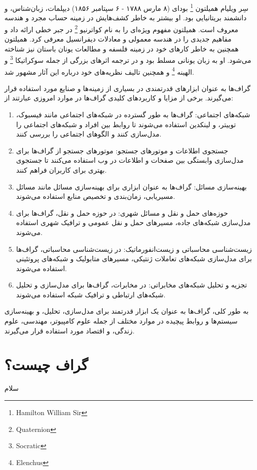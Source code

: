 \documentclass[a4paper,10pt]{book}
\begin{document}
        سِر ویلیام همیلتون
        \footnote{\hspace{2pt}Hamilton William Sir}
        بودای (۸ مارس ۱۷۸۸ - ۶ سپتامبر ۱۸۵۶) دیپلمات، زبان‌شناس، و دانشمند بریتانیایی بود. او بیشتر به خاطر کشف‌هایش در زمینه حساب مجرد و هندسه معروف است. همیلتون مفهوم ویژه‌ای را به نام کواترنیو
        \footnote{\hspace{2pt}Quaternion}
        در جبر خطی ارائه داد و مفاهیم جدیدی را در هندسه معمولی و معادلات دیفرانسیل معرفی کرد. همیلتون همچنین به خاطر کارهای خود در زمینه فلسفه و مطالعات یونان باستان نیز شناخته می‌شود. او به زبان یونانی مسلط بود و در ترجمه اثرهای بزرگی از جمله سوکراتیکا
        \footnote{\hspace{2pt}Socratic}
        و الهینه
        \footnote{\hspace{2pt}Elenchus}
        و همچنین تالیف نظریه‌های خود درباره این آثار مشهور شد.

        گراف‌ها به عنوان ابزارهای قدرتمندی در بسیاری از زمینه‌ها و صنایع مورد استفاده قرار می‌گیرند. برخی از مزایا و کاربردهای کلیدی گراف‌ها در موارد امروزی عبارتند از:

        \begin{enumerate}
            
            \item شبکه‌های اجتماعی: گراف‌ها به طور گسترده در شبکه‌های اجتماعی مانند فیسبوک، توییتر، و لینکدین استفاده می‌شوند تا روابط بین افراد و شبکه‌های اجتماعی را مدل‌سازی کنند و الگوهای اجتماعی را بررسی کنند.

            \item جستجوی اطلاعات و موتورهای جستجو: موتورهای جستجو از گراف‌ها برای مدل‌سازی وابستگی بین صفحات و اطلاعات در وب استفاده می‌کنند تا جستجوی بهتری برای کاربران فراهم کنند.

            \item بهینه‌سازی مسائل: گراف‌ها به عنوان ابزاری برای بهینه‌سازی مسائل مانند مسائل مسیریابی، زمان‌بندی و تخصیص منابع استفاده می‌شوند.

            \item حوزه‌های حمل و نقل و مسائل شهری: در حوزه حمل و نقل، گراف‌ها برای مدل‌سازی شبکه‌های جاده، مسیرهای حمل و نقل عمومی و ترافیک شهری استفاده می‌شوند.

            \item زیست‌شناسی محاسباتی و زیست‌انفورماتیک: در زیست‌شناسی محاسباتی، گراف‌ها برای مدل‌سازی شبکه‌های تعاملات ژنتیکی، مسیرهای متابولیک و شبکه‌های پروتئینی استفاده می‌شوند.

            \item تجزیه و تحلیل شبکه‌های مخابراتی: در مخابرات، گراف‌ها برای مدل‌سازی و تحلیل شبکه‌های ارتباطی و ترافیک شبکه استفاده می‌شوند.

        \end{enumerate}

        به طور کلی، گراف‌ها به عنوان یک ابزار قدرتمند برای مدل‌سازی، تحلیل، و بهینه‌سازی سیستم‌ها و روابط پیچیده در موارد مختلف از جمله علوم کامپیوتر، مهندسی، علوم زندگی، و اقتصاد مورد استفاده قرار می‌گیرند.

        \section{گراف چیست؟}

            سلام
        
\end{document}
